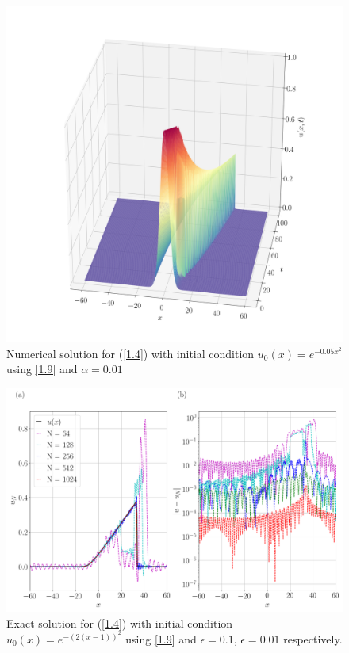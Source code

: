 	\begin{figure}
		\includegraphics[width=\textwidth]{Figures/Collocation/Graphics/eps=0.01/Numerical_Solution_alpha=001.png}
		\caption{Numerical solution for (\ref{1.4}) with initial condition $u_0 (x) = e^{- 0.05 x^2}$ using \ref{1.9} and $\alpha = 0.01$}
		\label{Exact_Solution}
	\end{figure}
	\begin{figure}
		\includegraphics[width=\textwidth]{Figures/Collocation/Graphics/eps=0.01/Numerical_Solution_alpha=001_T=100.png}
		\caption{Exact solution for (\ref{1.4}) with initial condition $u_0 (x) = e^{-(2(x - 1))^2}$ using \ref{1.9} and $\epsilon = 0.1$, $\epsilon = 0.01$ respectively.}
		\label{Exact_Solution}
	\end{figure}

